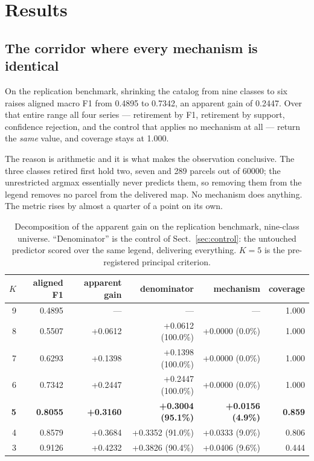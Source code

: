 \section{Results}
\label{sec:results}

\subsection{The corridor where every mechanism is identical}
\label{sec:corridor}

On the replication benchmark, shrinking the catalog from nine classes to six raises aligned macro
F1 from \num{0.4895} to \num{0.7342}, an apparent gain of \num{0.2447}. Over that entire range all
four series --- retirement by F1, retirement by support, confidence rejection, and the control that
applies no mechanism at all --- return the \emph{same} value, and coverage stays at
\num{1.000}.

The reason is arithmetic and it is what makes the observation conclusive. The three classes
retired first hold two, seven and \num{289} parcels out of \num{60000}; the unrestricted argmax
essentially never predicts them, so removing them from the legend removes no parcel from the
delivered map. No mechanism does anything. The metric rises by almost a quarter of a point on its
own.

\begin{table}[tbp]
\caption{Decomposition of the apparent gain on the replication benchmark, nine-class universe.
``Denominator'' is the control of Sect.~\ref{sec:control}: the untouched predictor scored over the
same legend, delivering everything. $K = 5$ is the pre-registered principal criterion.}
\label{tab:decomposition}
\centering
\begin{tabular}{rrrrrr}
\toprule
$K$ & aligned F1 & apparent gain & denominator & mechanism & coverage \\
\midrule
9 & 0.4895 & ---     & ---              & ---            & 1.000 \\
8 & 0.5507 & +0.0612 & +0.0612 (100.0\%) & +0.0000 (0.0\%) & 1.000 \\
7 & 0.6293 & +0.1398 & +0.1398 (100.0\%) & +0.0000 (0.0\%) & 1.000 \\
6 & 0.7342 & +0.2447 & +0.2447 (100.0\%) & +0.0000 (0.0\%) & 1.000 \\
\textbf{5} & \textbf{0.8055} & \textbf{+0.3160} & \textbf{+0.3004 (95.1\%)} & \textbf{+0.0156 (4.9\%)} & \textbf{0.859} \\
4 & 0.8579 & +0.3684 & +0.3352 (91.0\%) & +0.0333 (9.0\%) & 0.806 \\
3 & 0.9126 & +0.4232 & +0.3826 (90.4\%) & +0.0406 (9.6\%) & 0.444 \\
\bottomrule
\end{tabular}
\end{table}


